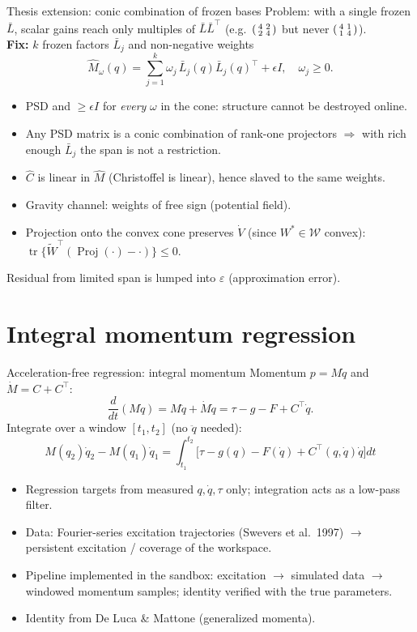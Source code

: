 \documentclass[aspectratio=169,10pt]{beamer}
\newenvironment{psmallmatrix}{\left(\begin{smallmatrix}}{\end{smallmatrix}\right)}
\newcommand{\tr}{\operatorname{tr}}
\newcommand{\dq}{\dot q}
\begin{document}
\begin{frame}{Thesis extension: conic combination of frozen bases}
Problem: with a single frozen $\bar L$, scalar gains reach only multiples of $\bar L\bar L^\top$ (e.g.\ $\begin{psmallmatrix}4&2\\2&4\end{psmallmatrix}$ but never $\begin{psmallmatrix}4&1\\1&4\end{psmallmatrix}$).\\[1mm]
\textbf{Fix:} $k$ frozen factors $\bar L_j$ and non-negative weights
\[
\hat M_\omega(q)=\sum_{j=1}^k\omega_j\,\bar L_j(q)\bar L_j(q)^\top+\epsilon I,\quad\omega_j\ge0 .
\]
\begin{itemize}
\item PSD and $\ge\epsilon I$ for \emph{every} $\omega$ in the cone: structure cannot be destroyed online.
\item Any PSD matrix is a conic combination of rank-one projectors $\Rightarrow$ with rich enough $\bar L_j$ the span is not a restriction.
\item $\hat C$ is linear in $\hat M$ (Christoffel is linear), hence slaved to the same weights.
\item Gravity channel: weights of free sign (potential field).
\item Projection onto the convex cone preserves $\dot V$ (since $W^*\in\mathcal W$ convex): $\tr\{\tilde W^\top(\operatorname{Proj}(\cdot)-\cdot)\}\le0$.
\end{itemize}
Residual from limited span is lumped into $\varepsilon$ (approximation error).
\end{frame}

\section{Integral momentum regression}
\begin{frame}{Acceleration-free regression: integral momentum}
Momentum $p=M\dq$ and $\dot M=C+C^\top$:
\[
\frac{d}{dt}(M\dq)=M\ddot q+\dot M\dq=\tau-g-F+C^\top\dq .
\]
Integrate over a window $[t_1,t_2]$ (no $\ddot q$ needed):
\[
\boxed{\ M(q_2)\dq_2-M(q_1)\dq_1=\int_{t_1}^{t_2}\!\big[\tau-g(q)-F(\dq)+C^\top(q,\dq)\dq\big]dt\ }
\]
\begin{itemize}
\item Regression targets from measured $q,\dq,\tau$ only; integration acts as a low-pass filter.
\item Data: Fourier-series excitation trajectories (Swevers et al.\ 1997) $\to$ persistent excitation / coverage of the workspace.
\item Pipeline implemented in the sandbox: excitation $\to$ simulated data $\to$ windowed momentum samples; identity verified with the true parameters.
\item Identity from De Luca \& Mattone (generalized momenta).
\end{itemize}
\end{frame}
\end{document}
